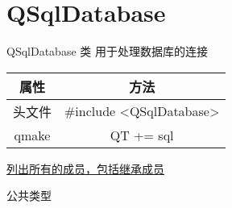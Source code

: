 \chapter{QSqlDatabase}

QSqlDatabase 类 用于处理数据库的连接

\begin{tabular}{|c|c|}
	\hline
	属性 & 方法 \\
	\hline
	头文件 & \#include <QSqlDatabase>\\      
	\hline
	qmake & QT += sql\\      
	\hline
\end{tabular}

\href{https://doc.qt.io/qt-5/qsqldatabase-members.html}{列出所有的成员，包括继承成员}


公共类型


